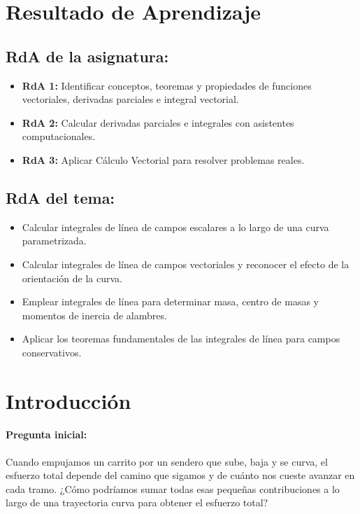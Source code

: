 \documentclass[a4,11pt]{aleph-notas}
\begin{document}
\encabezado

\section*{Resultado de Aprendizaje}

\subsection*{RdA de la asignatura:}
\begin{itemize}[leftmargin=*]
    \item \textbf{RdA 1:} Identificar conceptos, teoremas y propiedades de funciones vectoriales, derivadas parciales e integral vectorial.
    \item \textbf{RdA 2:} Calcular derivadas parciales e integrales con asistentes computacionales.
    \item \textbf{RdA 3:} Aplicar Cálculo Vectorial para resolver problemas reales.
\end{itemize}

\subsection*{RdA del tema:}
\begin{itemize}[leftmargin=*]
    \item Calcular integrales de línea de campos escalares a lo largo de una curva parametrizada.
    \item Calcular integrales de línea de campos vectoriales y reconocer el efecto de la orientación de la curva.
    \item Emplear integrales de línea para determinar masa, centro de masas y momentos de inercia de alambres.
    \item Aplicar los teoremas fundamentales de las integrales de línea para campos conservativos.
\end{itemize}

\section*{Introducción}

\paragraph{Pregunta inicial:}
Cuando empujamos un carrito por un sendero que sube, baja y se curva, el esfuerzo total depende del camino que sigamos y de cuánto nos cueste avanzar en cada tramo. ¿Cómo podríamos sumar todas esas pequeñas contribuciones a lo largo de una trayectoria curva para obtener el esfuerzo total?
\end{document}
